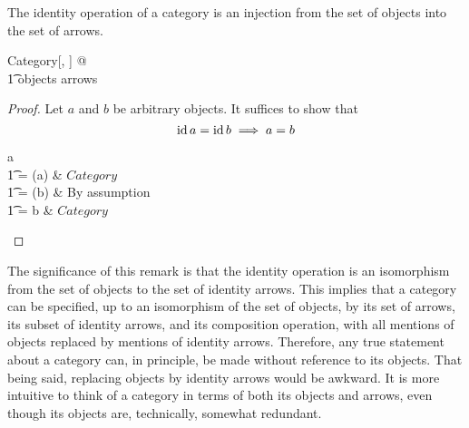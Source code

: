 \documentclass{amsart}
\begin{document}
\begin{remark}
The identity operation of a category is an injection from the set of objects into the set of arrows.
\begin{zed}
	\forall Category[\setO, \setA] @ \\
	\t1	\idCat \in objects \inj arrows
\end{zed}

\begin{proof}
Let $a$ and $b$ be arbitrary objects.
It suffices to show that
\[
	\operatorname{id} a = \operatorname{id} b \implies a = b
\]

\begin{argue}
	a \\
	\t1	= \domCat (\idCat a)	& $Category$ \\
	\t1	= \domCat (\idCat b)	& By assumption \\
	\t1	= b				& $Category$
\end{argue}
\end{proof}

\end{remark}

The significance of this remark is that the identity operation is an isomorphism from the set of objects to the set of identity arrows.
This implies that a category can be specified, up to an isomorphism of the set of objects, 
by its set of arrows, its subset of identity arrows, and its composition operation,
with all mentions of objects replaced by mentions of identity arrows.
Therefore, any true statement about a category can, in principle, be made without reference to its objects.
That being said, replacing objects by identity arrows would be awkward. 
It is more intuitive to think of a category in terms of both its objects and arrows, 
even though its objects are, technically, somewhat redundant.
\end{document}
